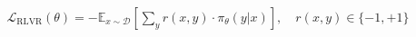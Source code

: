 \documentclass[preview]{standalone}
\begin{document}
\begin{align*}
\mathcal{L}_{\mathrm{RLVR}}(\theta) = -\mathbb{E}_{x \sim \mathcal{D}}\left[\sum_{y} r(x, y)\cdot\pi_{\theta}(y|x)\right],\quad r(x, y)\in\{-1,+1\}
\end{align*}
\end{document}
